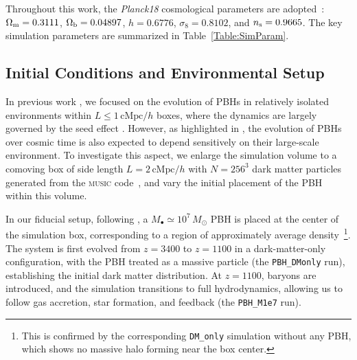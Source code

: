 \documentclass[twocolumn,trackchanges]{aastex701}
\begin{document}
Throughout this work, the \textit{Planck18} cosmological parameters are adopted~\citep{Plank2020A&A...641A...6P}: $\Omega_{\rm m}=0.3111$, $\Omega_{\rm b}=0.04897$, $h=0.6776$, $\sigma_8=0.8102$, and $n_{\rm s}=0.9665$. The key simulation parameters are summarized in Table~\ref{Table:SimParam}.



\subsection{Initial Conditions and Environmental Setup\label{subsec:ini}}

In previous work \citep{ZhangPBHGalaxy2025ApJ, ZhangDCBHPBH2025ApJ, Zhang2026PBHApJL}, we focused on the evolution of PBHs in relatively isolated environments within $L \leq 1\,\mathrm{cMpc}/h$ boxes, where the dynamics are largely governed by the seed effect \citep{Mack2007ApJ}. However, as highlighted in \citet{ZhangPBH2024ApJ}, the evolution of PBHs over cosmic time is also expected to depend sensitively on their large-scale environment. To investigate this aspect, we enlarge the simulation volume to a comoving box of side length $L = 2\,\mathrm{cMpc}/h$ with $N=256^3$ dark matter particles generated from the \textsc{music} code~\citep{hahn2011multi}, and vary the initial placement of the PBH within this volume.

In our fiducial setup, following \citet{Zhang2026PBHApJL}, a $M_{\bullet}\simeq 10^7\,M_{\odot}$ PBH is placed at the center of the simulation box, corresponding to a region of approximately average density~\footnote{This is confirmed by the corresponding \texttt{DM\_only} simulation without any PBH, which shows no massive halo forming near the box center.}. The system is first evolved from $z = 3400$ to $z = 1100$ in a dark-matter-only configuration, with the PBH treated as a massive particle (the \texttt{PBH\_DMonly} run), establishing the initial dark matter distribution. At $z = 1100$, baryons are introduced, and the simulation transitions to full hydrodynamics, allowing us to follow gas accretion, star formation, and feedback (the \texttt{PBH\_M1e7} run).
\end{document}

